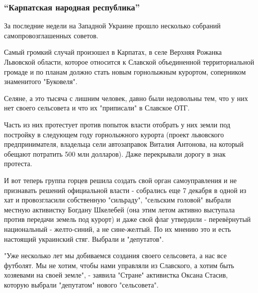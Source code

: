  
 
 
 
 
\subsubsection{\enquote{Карпатская народная республика}}
\label{sec:22_12_2020.news.ua.strana.sibircev_aleksandr.1.ukraina_respublika.karpatska_narodna_respublika}

За последние недели на Западной Украине прошло несколько собраний
самопровозглашенных советов. 

Самый громкий случай произошел в Карпатах, в селе Верхняя Рожанка
Львовской области, которое относится к Славской объединенной
территориальной громаде и по планам должно стать новым горнолыжным
курортом, соперником знаменитого "Буковеля".

Селяне, а это тысяча с лишним человек, давно были недовольны тем, что у
них нет своего сельсовета и что их "приписали" в Славское ОТГ.

Часть из них протестует против попыток власти отобрать у них земли под
постройку в следующем году горнолыжного курорта (проект львовского
предпринимателя, владельца сели автозаправок Виталия Антонова, на который
обещают потратить 500 млн долларов). Даже перекрывали дорогу в знак
протеста.

И вот теперь группа горцев решила создать свой орган самоуправления и не
признавать решений официальной власти - собрались еще 7 декабря в одной из
хат и провозгласили собственную "сильраду", "сельским головой" выбрали
местную активистку Богдану Шкелебей (она этим летом активно выступала
против передачи земель под курорт) и даже свой флаг утвердили -
перевёрнутый национальный - желто-синий, а не сине-желтый. По их мнению
это и есть настоящий украинский стяг. Выбрали и "депутатов".

"Уже несколько лет мы добиваемся создания своего сельсовета, а нас все
футболят. Мы не хотим, чтобы нами управляли из Славского, а хотим быть
хозяевами на своей земле", - заявила "Стране" активистка Оксана Стасив,
которую выбрали "депутатом" нового "сельсовета".    

